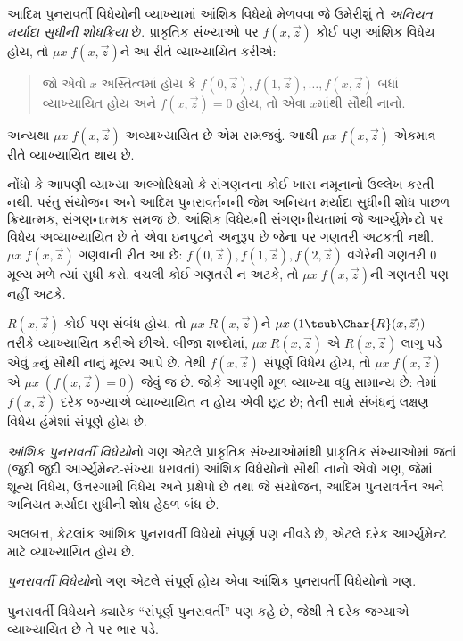 \documentclass[../../../include/open-logic-section]{subfiles}
\begin{document}
આદિમ પુનરાવર્તી વિધેયોની વ્યાખ્યામાં આંશિક વિધેયો મેળવવા જે
ઉમેરીશું તે \emph{અનિયત મર્યાદા સુધીની શોધક્રિયા} છે. પ્રાકૃતિક
સંખ્યાઓ પર $f(x,\vec z)$ કોઈ પણ આંશિક વિધેય હોય, તો
$\mu x \; f(x,\vec z)$ને આ રીતે વ્યાખ્યાયિત કરીએ:
\begin{quote}
  જો એવો $x$ અસ્તિત્વમાં હોય કે $f(0,\vec z), f(1,\vec z),
  \dots, f(x,\vec
  z)$ બધાં વ્યાખ્યાયિત હોય અને $f(x,\vec z) = 0$ હોય, તો એવા
  $x$માંથી સૌથી નાનો.
\end{quote}
અન્યથા $\mu x \; f(x,\vec z)$ અવ્યાખ્યાયિત છે એમ સમજવું.
આથી $\mu x \; f(x,\vec z)$ એકમાત્ર રીતે વ્યાખ્યાયિત થાય છે.

\begin{explain}
નોંધો કે આપણી વ્યાખ્યા
અલ્ગોરિધમો કે સંગણનના કોઈ ખાસ નમૂનાનો ઉલ્લેખ કરતી નથી. પરંતુ
સંયોજન અને આદિમ પુનરાવર્તનની જેમ અનિયત મર્યાદા સુધીની શોધ પાછળ
ક્રિયાત્મક, સંગણનાત્મક સમજ છે. આંશિક વિધેયની સંગણનીયતામાં જે
આર્ગ્યુમેન્ટો પર વિધેય અવ્યાખ્યાયિત છે તે એવા ઇનપુટને અનુરૂપ છે
જેના પર ગણતરી અટકતી નથી. $\mu x \;
f(x,\vec z)$ ગણવાની રીત આ છે: $f(0,\vec z), f(1,\vec z),
f(2,\vec z)$ વગેરેની ગણતરી 0 મૂલ્ય મળે ત્યાં સુધી કરો.
વચલી કોઈ ગણતરી ન અટકે, તો $\mu x \; f(x,\vec z)$ની ગણતરી પણ
નહીં અટકે.
\end{explain}

$R(x,\vec z)$ કોઈ પણ સંબંધ હોય, તો $\mu x \; R(x,\vec z)$ને
$\mu x \; (1 \tsub \Char{R}(x,\vec z))$ તરીકે વ્યાખ્યાયિત
કરીએ છીએ. બીજા શબ્દોમાં, $\mu x \; R(x,\vec z)$ એ $R(x,\vec z)$
લાગુ પડે એવું $x$નું સૌથી નાનું મૂલ્ય આપે છે. તેથી $f(x,\vec z)$
સંપૂર્ણ વિધેય હોય, તો $\mu x \; f(x,\vec
z)$ એ $\mu x \; (f(x,\vec z) = 0)$ જેવું જ છે. જોકે આપણી
મૂળ વ્યાખ્યા વધુ સામાન્ય છે: તેમાં $f(x,\vec z)$ દરેક જગ્યાએ
વ્યાખ્યાયિત ન હોય એવી છૂટ છે; તેની સામે સંબંધનું લક્ષણ વિધેય
હંમેશાં સંપૂર્ણ હોય છે.

\begin{defn}
\emph{આંશિક પુનરાવર્તી વિધેયો}નો ગણ એટલે પ્રાકૃતિક સંખ્યાઓમાંથી
પ્રાકૃતિક સંખ્યાઓમાં જતાં (જુદી જુદી આર્ગ્યુમેન્ટ-સંખ્યા ધરાવતાં)
આંશિક વિધેયોનો સૌથી નાનો એવો ગણ, જેમાં શૂન્ય વિધેય,
ઉત્તરગામી વિધેય અને પ્રક્ષેપો છે તથા જે સંયોજન, આદિમ પુનરાવર્તન
અને અનિયત મર્યાદા સુધીની શોધ હેઠળ બંધ છે.
\end{defn}

અલબત્ત, કેટલાંક આંશિક પુનરાવર્તી વિધેયો સંપૂર્ણ પણ નીવડે છે,
એટલે દરેક આર્ગ્યુમેન્ટ માટે વ્યાખ્યાયિત હોય છે.

\begin{defn}
\emph{પુનરાવર્તી વિધેયો}નો ગણ એટલે સંપૂર્ણ હોય એવા આંશિક
પુનરાવર્તી વિધેયોનો ગણ.
\end{defn}

પુનરાવર્તી વિધેયને ક્યારેક ``સંપૂર્ણ પુનરાવર્તી'' પણ કહે છે,
જેથી તે દરેક જગ્યાએ વ્યાખ્યાયિત છે તે પર ભાર પડે.
\end{document}
